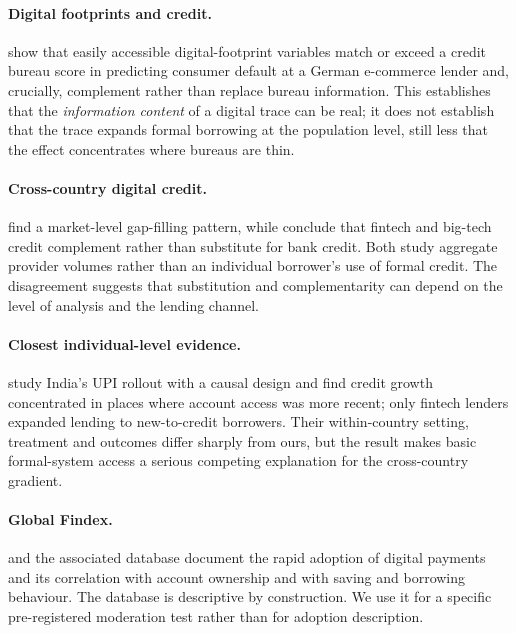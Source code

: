 \paragraph{Digital footprints and credit.} \citet{BergBurgGombovicPuri2020} show that easily
accessible digital-footprint variables match or exceed a credit bureau score in predicting
consumer default at a German e-commerce lender and, crucially, complement rather than
replace bureau information. This establishes that the \emph{information content} of a
digital trace can be real; it does not establish that the trace expands formal borrowing at
the population level, still less that the effect concentrates where bureaus are thin.

\paragraph{Cross-country digital credit.} \citet{BazarbashBeaton2020} find a market-level
gap-filling pattern, while \citet{CornelliEtAl2023} conclude that fintech and big-tech
credit complement rather than substitute for bank credit. Both study aggregate provider
volumes rather than an individual borrower's use of formal credit. The disagreement suggests
that substitution and complementarity can depend on the level of analysis and the lending
channel.

\paragraph{Closest individual-level evidence.} \citet{AlokGhoshKulkarniPuri2024} study
India's UPI rollout with a causal design and find credit growth concentrated in places where
account access was more recent; only fintech lenders expanded lending to new-to-credit
borrowers. Their within-country setting, treatment and outcomes differ sharply from ours,
but the result makes basic formal-system access a serious competing explanation for the
cross-country gradient.

\paragraph{Global Findex.} \citet{KlapperSingerStaritaNorris2025} and the associated
database document the rapid adoption of digital payments and its correlation with account
ownership and with saving and borrowing behaviour. The database is descriptive by
construction. We use it for a specific pre-registered moderation test rather than for
adoption description.

